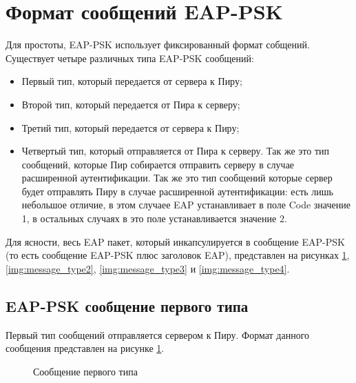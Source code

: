\newpage
\section{Формат сообщений EAP-PSK}

Для простоты, EAP-PSK использует фиксированный формат собщений. Существует четыре различных типа EAP-PSK сообщений:

\begin{itemize}
\item Первый тип, который передается от сервера к Пиру;
\item Второй тип, который передается от Пира к серверу;
\item Третий тип, который передается от сервера к Пиру;
\item Четвертый тип, который отправляется от Пира к серверу. Так же это тип сообщений, которые Пир собирается отправить серверу в случае расширенной аутентификации. Так же это тип сообщений которые сервер будет отправлять Пиру в случае расширенной аутентификации: есть лишь небольшое отличие, в этом случаее EAP устанавливает в поле Code значение 1, в остальных случаях в это поле устанавливается значение 2.
\end{itemize}

Для ясности, весь EAP пакет, который инкапсулируется в сообщение EAP-PSK (то есть сообщение EAP-PSK плюс заголовок EAP), представлен на рисунках \ref{img:message_type1}, \ref{img:message_type2}, \ref{img:message_type3} и \ref{img:message_type4}.

\subsection{EAP-PSK сообщение первого типа}

Первый тип сообщений отправляется сервером к Пиру. Формат данного сообщения представлен на рисунке \ref{img:message_type1}.

\begin{figure}[h!]
\caption{Сообщение первого типа}
\label{img:message_type1}
\end{figure}

